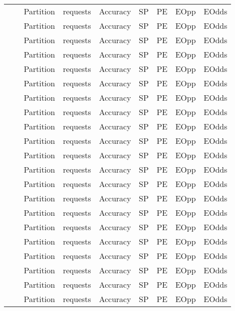 \begin{tabular}{lllllllll}
        &       & Partition &  requests &  Accuracy &  SP &  PE &  EOpp &  EOdds \\
        &       & Partition &  requests &  Accuracy &  SP &  PE &  EOpp &  EOdds \\
        &       & Partition &  requests &  Accuracy &  SP &  PE &  EOpp &  EOdds \\
        &       & Partition &  requests &  Accuracy &  SP &  PE &  EOpp &  EOdds \\
        &       & Partition &  requests &  Accuracy &  SP &  PE &  EOpp &  EOdds \\
        &       & Partition &  requests &  Accuracy &  SP &  PE &  EOpp &  EOdds \\
        &       & Partition &  requests &  Accuracy &  SP &  PE &  EOpp &  EOdds \\
        &       & Partition &  requests &  Accuracy &  SP &  PE &  EOpp &  EOdds \\
        &       & Partition &  requests &  Accuracy &  SP &  PE &  EOpp &  EOdds \\
        &       & Partition &  requests &  Accuracy &  SP &  PE &  EOpp &  EOdds \\
        &       & Partition &  requests &  Accuracy &  SP &  PE &  EOpp &  EOdds \\
        &       & Partition &  requests &  Accuracy &  SP &  PE &  EOpp &  EOdds \\
        &       & Partition &  requests &  Accuracy &  SP &  PE &  EOpp &  EOdds \\
        &       & Partition &  requests &  Accuracy &  SP &  PE &  EOpp &  EOdds \\
        &       & Partition &  requests &  Accuracy &  SP &  PE &  EOpp &  EOdds \\
        &       & Partition &  requests &  Accuracy &  SP &  PE &  EOpp &  EOdds \\
        &       & Partition &  requests &  Accuracy &  SP &  PE &  EOpp &  EOdds \\
        &       & Partition &  requests &  Accuracy &  SP &  PE &  EOpp &  EOdds \\
        &       & Partition &  requests &  Accuracy &  SP &  PE &  EOpp &  EOdds \\
        &       & Partition &  requests &  Accuracy &  SP &  PE &  EOpp &  EOdds \\
        &       & Partition &  requests &  Accuracy &  SP &  PE &  EOpp &  EOdds \\

\end{tabular}
